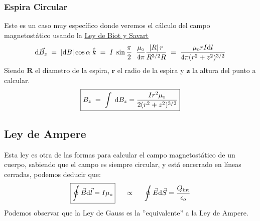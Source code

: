 \subsubsection{Espira Circular}
\begin{wrapfigure}{r}{4cm}
\end{wrapfigure}
\noindent Este es un caso muy específico donde veremos el cálculo del campo magnetostático usando la \underline{Ley de Biot y Savart}
\[
        \mathrm{d}\vec{B_z}\hspace{1mm}=\hspace{1mm}\left | \mathrm{d}B \right |\cos{\alpha}\hspace{1mm}\hat{k} \hspace{1mm}=\hspace{1mm} I\hspace{1mm}\sin{\frac{\pi}{2}}\hspace{2mm}\frac{\mu_{\textnormal{o}}}{4\pi} \frac{\left | R \right  |r}{R^{3/2}R}\hspace{1mm}=\hspace{1mm}\frac{\mu_{\textnormal{o}}rI\mathrm{d}l}{4\pi(r^2+z^2)^{3/2}}
\]
\noindent Siendo \(\mathbf{R}\) el diametro de la espira, \(\mathbf{r}\) el radio de la espira y \(\mathbf{z}\) la altura del punto a calcular.
\[
        \boxed{B_z \hspace{1mm} = \hspace{1mm}\int \hspace{1mm} \mathrm{d}B_z = \frac{Ir^2\mu_{\textnormal{o}}}{2(r^2+z^2)^{3/2}}}
\]
\subsection{Ley de Ampere}
\noindent Esta ley es otra de las formas para calcular el campo magnetostático de un cuerpo, sabiendo que el campo es siempre circular, y está encerrado en líneas cerradas, podemos deducir que:
\[
        \boxed{\oint \vec{B}\mathrm{d}\vec{l} = I\mu_{\textnormal{o}}} \hspace{.5cm} \propto \hspace{.5cm} \oint \vec{E}\mathrm{d}\vec{S} = \frac{Q_\textnormal{int}}{\epsilon_o}
\]
\noindent Podemos observar que la Ley de Gauss es la ''equivalente'' a la Ley de Ampere.
